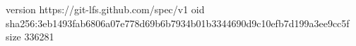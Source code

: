 version https://git-lfs.github.com/spec/v1
oid sha256:3eb1493fab6806a07e778d69b6b7934b01b3344690d9c10efb7d199a3ee9cc5f
size 336281
